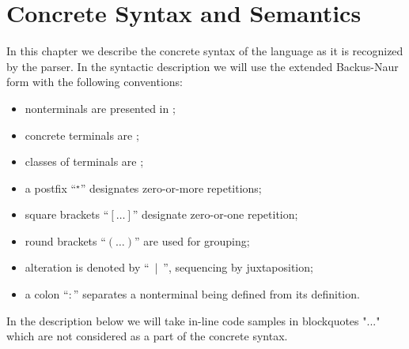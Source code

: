 \chapter{Concrete Syntax and Semantics}
\label{sec:concrete_syntax}

In this chapter we describe the concrete syntax of the language as it is recognized by the parser. In the
syntactic description we will use the extended Backus-Naur form with the following conventions:

\begin{itemize}
\item nonterminals are presented in ;
\item concrete terminals are ;
\item classes of terminals are ;
\item a postfix ``$^\star$'' designates zero-or-more repetitions;
\item square brackets ``$[\dots]$'' designate zero-or-one repetition;
\item round brackets ``$(\dots)$'' are used for grouping;
\item alteration is denoted by ``$\:\:\mid\:\:$'', sequencing by juxtaposition;
\item a colon ``$:$'' separates a nonterminal being defined from its definition.
\end{itemize}

In the description below we will take in-line code samples in blockquotes "..." which are not considered as a
part of the concrete syntax.








